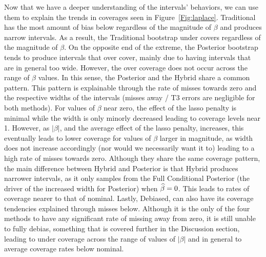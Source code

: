 Now that we have a deeper understanding of the intervals' behaviors, we can use them to explain the trends in coverages seen in Figure~\ref{Fig:laplace}. Traditional has the most amount of bias below regardless of the magnitude of $\beta$ and produces narrow intervals. As a result, the Traditional bootstrap under covers regardless of the magnitude of $\beta$. On the opposite end of the extreme, the Posterior bootstrap tends to produce intervals that over cover, mainly due to having intervals that are in general too wide. However, the over coverage does not occur across the range of $\beta$ values. In this sense, the Posterior and the Hybrid share a common pattern. This pattern is explainable through the rate of misses towards zero and the respective widths of the intervals (misses away / T3 errors are negligible for both methods). For values of $\beta$ near zero, the effect of the lasso penalty is minimal while the width is only minorly decreased leading to coverage levels near 1. However, as $|\beta|$, and the average effect of the lasso penalty, increases, this eventually leads to lower coverage for values of $\beta$ larger in magnitude, as width does not increase accordingly (nor would we necessarily want it to) leading to a high rate of misses towards zero. Although they share the same coverage pattern, the main difference between Hybrid and Posterior is that Hybrid produces narrower intervals, as it only samples from the Full Conditional Posterior (the driver of the increased width for Posterior) when $\widehat{\beta} = 0$. This leads to rates of coverage nearer to that of nominal. Lastly, Debiased, can also have its coverage tendencies explained through misses below. Although it is the only of the four methods to have any significant rate of missing away from zero, it is still unable to fully debias, something that is covered further in the Discussion section, leading to under coverage across the range of values of $|\beta|$ and in general to average coverage rates below nominal. 

